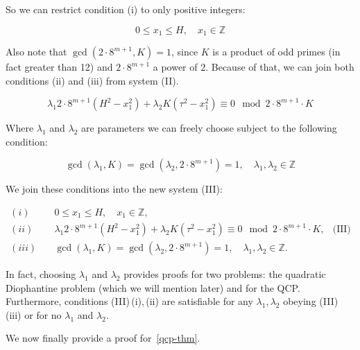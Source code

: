 \documentclass{amsart}
\theoremstyle{plain}
\begin{document}
So we can restrict condition (i) to only positive integers:

\begin{equation*}
  0\leq x_1\leq H, \quad x_1\in\mathbb{Z}
\end{equation*}

Also note that $\gcd(2\cdot 8^{m+1}, K)=1$, since $K$ is a product of odd primes (in fact greater
than 12) and $2\cdot 8^{m+1}$ a power of 2. Because of that, we can join both conditions (ii) and
(iii) from system (II).

\begin{equation*}
  \lambda_1 2\cdot 8^{m+1}(H^2-x_1^2)+\lambda_2 K(\tau^2-x_1^2)\equiv 0\mod 2\cdot 8^{m+1}\cdot K
\end{equation*}

Where $\lambda_1$ and $\lambda_2$ are parameters we can freely choose subject to the following
condition:

\begin{equation*}
  \gcd(\lambda_1,K)=\gcd(\lambda_2,2\cdot 8^{m+1})=1,\quad\lambda_1,\lambda_2\in\mathbb{Z}
\end{equation*}

We join these conditions into the new system (III):

\begin{align*}
  (i) \quad &0\leq x_1\leq H, \quad x_1\in\mathbb{Z},\\
  (ii) \quad &\lambda_1 2\cdot 8^{m+1}(H^2-x_1^2)+\lambda_2 K(\tau^2-x_1^2)\equiv 0\mod 2\cdot
    8^{m+1}\cdot K, &\text{(III)}\\
  (iii) \quad &\gcd(\lambda_1,K)=\gcd(\lambda_2,2\cdot 8^{m+1})=1,\quad\lambda_1,\lambda_2\in
    \mathbb{Z}.
\end{align*}

In fact, choosing $\lambda_1$ and $\lambda_2$ provides proofs for two problems: the quadratic
Diophantine problem (which we will mention later) and for the QCP\@. Furthermore, conditions
(III)\,(i),\,(ii) are satisfiable for any $\lambda_1,\lambda_2$ obeying (III)\,(iii) or for no
$\lambda_1$ and $\lambda_2$.

We now finally provide a proof for~\autoref{qcp-thm}.
\end{document}
